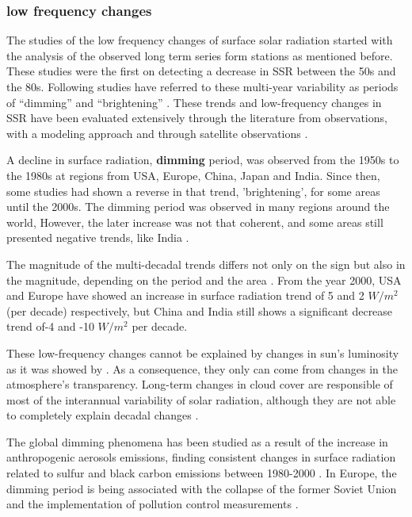 \subsubsection{low frequency changes}

The studies of the low frequency changes of surface solar radiation started with the analysis of the observed long term series form stations as mentioned before. These studies were the first on detecting a decrease in SSR between the 50s and the 80s. Following studies have referred to these multi-year variability as periods of ``dimming'' and ``brightening'' \cite*{Wild2012}. These trends and low-frequency changes in SSR have been evaluated extensively through the literature from observations, with a modeling approach and through satellite observations \cite*{Wilcox2013, Wild2005, Wild2009, Sanchez-Lorenzo2009, Mateos2014, Pfeifroth2017}.

A decline in surface radiation, \textbf{dimming} period, was observed from the 1950s to the 1980s at regions from USA, Europe, China, Japan and India. Since then, some studies had shown a reverse in that trend, 'brightening', for some areas until the 2000s. The dimming period was observed in many regions around the world, However, the later increase was not that coherent, and some areas still presented negative trends, like India \cite*{Wild2012}.

The magnitude of the multi-decadal trends differs not only on the sign but also in the magnitude, depending on the period and the area \cite*{Wild2009, Wild2012}. From the year 2000, USA and Europe have showed an increase in surface radiation trend of 5 and 2 $W/m^2$ (per decade) respectively, but China and India still shows a significant decrease trend of-4 and -10 $W/m^2$ per decade. 

These low-frequency changes cannot be explained by changes in sun's luminosity as it was showed by \cite*{Willson2003}. As a consequence, they only can come from changes in the atmosphere's transparency. Long-term changes in cloud cover are responsible of most of the interannual variability of solar radiation, although they are not able to completely explain decadal changes \cite*{Norris2007, Sanchez-Lorenzo2009}.

The global dimming phenomena has been studied as a result of the increase in anthropogenic aerosols emissions, finding consistent changes in surface radiation related to sulfur and black carbon emissions between 1980-2000 \cite*{Streets2006, Norris2007}. In Europe, the dimming period is being associated with the collapse of the former Soviet Union and the implementation of pollution control measurements \cite*{Wild2005, Wild2009}. %

